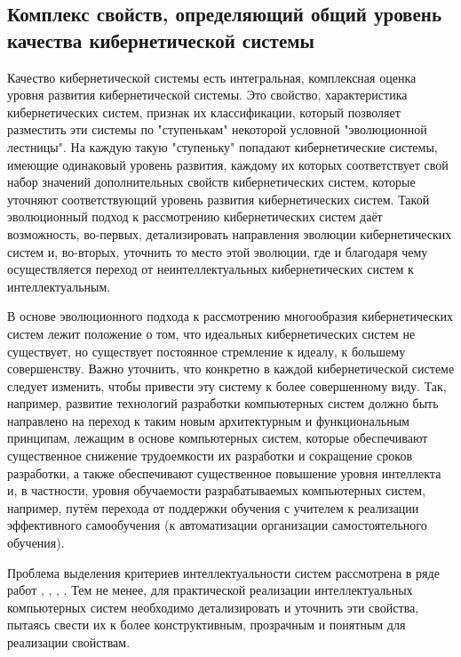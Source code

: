 \subsection{Комплекс свойств, определяющий общий уровень качества кибернетической системы}
{\label{sec_cyb_syst_overall_quality}} 

Качество кибернетической системы есть интегральная, комплексная оценка уровня развития кибернетической системы. 
Это свойство, характеристика кибернетических систем, признак их классификации, который позволяет разместить эти системы по "ступенькам"{} некоторой условной "эволюционной лестницы"{}.
На каждую такую "ступеньку"{} попадают кибернетические системы, имеющие одинаковый уровень развития, каждому их которых соответствует свой набор значений дополнительных свойств кибернетических систем, которые уточняют соответствующий уровень развития кибернетических систем. 
Такой эволюционный подход к рассмотрению кибернетических систем даёт возможность, во-первых, детализировать направления эволюции кибернетических систем и, во-вторых, уточнить то место этой эволюции, где и благодаря чему осуществляется переход от неинтеллектуальных кибернетических систем к интеллектуальным.

В основе эволюционного подхода к рассмотрению многообразия кибернетических систем лежит положение о том, что идеальных кибернетических систем не существует, но существует постоянное стремление к идеалу, к большему совершенству. 
Важно уточнить, что конкретно в каждой кибернетической системе следует изменить, чтобы привести эту систему к более совершенному виду.
Так, например, развитие технологий разработки компьютерных систем должно быть направлено на переход к таким новым архитектурным и функциональным принципам, лежащим в основе компьютерных систем, которые обеспечивают существенное снижение трудоемкости их разработки и сокращение сроков разработки, а также обеспечивают существенное повышение уровня интеллекта и, в частности, уровня обучаемости разрабатываемых компьютерных систем, например, путём перехода от поддержки обучения с учителем к реализации эффективного самообучения (к автоматизации организации самостоятельного обучения). 

Проблема выделения критериев интеллектуальности систем рассмотрена в ряде работ , , , .
Тем не менее, для практической реализации интеллектуальных компьютерных систем необходимо детализировать и уточнить эти свойства, пытаясь свести их к более конструктивным, прозрачным и понятным для реализации свойствам.

